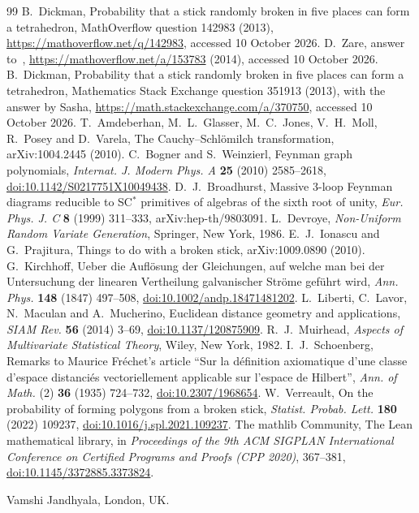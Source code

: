 \documentclass[11pt]{article}
\theoremstyle{remark}
\begin{document}
\begin{thebibliography}{99}
 B.~Dickman, Probability that a stick randomly broken in five places can form a tetrahedron,
MathOverflow question 142983 (2013), \url{https://mathoverflow.net/q/142983}, accessed 10 October 2026.
 D.~Zare, answer to~\cite{MO}, \url{https://mathoverflow.net/a/153783} (2014), accessed
10 October 2026.
 B.~Dickman, Probability that a stick randomly broken in five places can form a tetrahedron,
Mathematics Stack Exchange question 351913 (2013), with the answer by Sasha,
\url{https://math.stackexchange.com/a/370750}, accessed 10 October 2026.
 T.~Amdeberhan, M.~L.~Glasser, M.~C.~Jones, V.~H.~Moll, R.~Posey and D.~Varela, The
Cauchy--Schl\"omilch transformation, arXiv:1004.2445 (2010).
 C.~Bogner and S.~Weinzierl, Feynman graph polynomials, \emph{Internat. J. Modern Phys. A}
\textbf{25} (2010) 2585--2618,
\href{https://doi.org/10.1142/S0217751X10049438}{doi:10.1142/S0217751X10049438}.
 D.~J.~Broadhurst, Massive 3-loop Feynman diagrams reducible to SC$^*$ primitives of
algebras of the sixth root of unity, \emph{Eur. Phys. J. C} \textbf{8} (1999) 311--333,
arXiv:hep-th/9803091.
 L.~Devroye, \emph{Non-Uniform Random Variate Generation}, Springer, New York, 1986.
 E.~J.~Ionascu and G.~Prajitura, Things to do with a broken stick, arXiv:1009.0890 (2010).
 G.~Kirchhoff, Ueber die Aufl\"osung der Gleichungen, auf welche man bei der Untersuchung
der linearen Vertheilung galvanischer Str\"ome gef\"uhrt wird, \emph{Ann. Phys.} \textbf{148} (1847)
497--508, \href{https://doi.org/10.1002/andp.18471481202}{doi:10.1002/andp.18471481202}.
 L.~Liberti, C.~Lavor, N.~Maculan and A.~Mucherino, Euclidean distance geometry and
applications, \emph{SIAM Rev.} \textbf{56} (2014) 3--69,
\href{https://doi.org/10.1137/120875909}{doi:10.1137/120875909}.
 R.~J.~Muirhead, \emph{Aspects of Multivariate Statistical Theory}, Wiley, New York, 1982.
 I.~J.~Schoenberg, Remarks to Maurice Fr\'echet's article ``Sur la d\'efinition
axiomatique d'une classe d'espace distanci\'es vectoriellement applicable sur l'espace de Hilbert'',
\emph{Ann. of Math.} (2) \textbf{36} (1935) 724--732,
\href{https://doi.org/10.2307/1968654}{doi:10.2307/1968654}.
 W.~Verreault, On the probability of forming polygons from a broken stick, \emph{Statist.
Probab. Lett.} \textbf{180} (2022) 109237,
\href{https://doi.org/10.1016/j.spl.2021.109237}{doi:10.1016/j.spl.2021.109237}.
 The mathlib Community, The Lean mathematical library, in \emph{Proceedings of the
9th ACM SIGPLAN International Conference on Certified Programs and Proofs (CPP 2020)}, 367--381,
\href{https://doi.org/10.1145/3372885.3373824}{doi:10.1145/3372885.3373824}.
\end{thebibliography}

\bigskip
\noindent Vamshi Jandhyala, London, UK.
\end{document}
